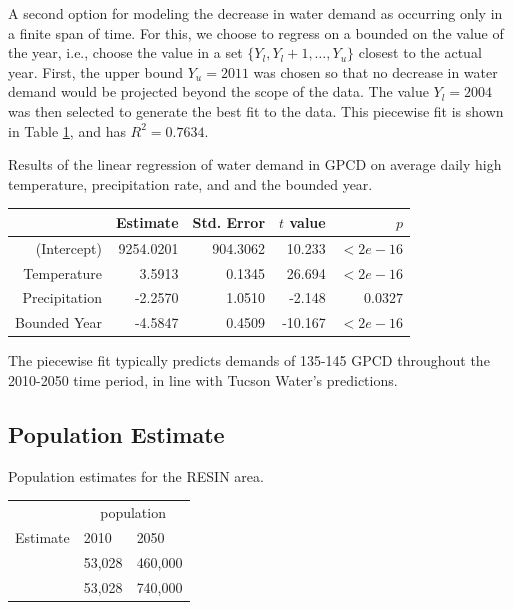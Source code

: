 \documentclass[opre,nonblindrev]{informs3} %
\begin{document}
A second option for modeling the decrease in water demand as occurring only in a finite span of time.
For this, we choose to regress on a bounded on the value of the year, i.e., choose the value in a set $\{Y_l, Y_l+1, \dots, Y_u\}$ closest to the actual year.
First, the upper bound $Y_u = 2011$ was chosen so that no decrease in water demand would be projected beyond the scope of the data.
The value $Y_l = 2004$ was then selected to generate the best fit to the data.
This piecewise fit is shown in Table \ref{tb:gpcd_piecewise_reg}, and has $R^2 = 0.7634$.

\begin{table}
	\TABLE
	{
		Results of the linear regression of water demand in GPCD on average daily high temperature, precipitation rate, and and the bounded year.
		\label{tb:gpcd_piecewise_reg}
	}
	{\begin{tabular}{rrrrr}
		\hline
						   & Estimate  & Std. Error & $t$ value & $p$ \\
		\hline
		(Intercept)    & 9254.0201 & 904.3062   & 10.233    & $<2e-16$ \\
		Temperature    & 3.5913    & 0.1345     & 26.694    & $<2e-16$ \\
		Precipitation  & -2.2570   & 1.0510     & -2.148    & $0.0327$ \\
		Bounded Year   & -4.5847   & 0.4509     & -10.167   & $<2e-16$ \\
		\hline
	\end{tabular}}
	{}
\end{table}

The piecewise fit typically predicts demands of 135-145 GPCD throughout the 2010-2050 time period, in line with Tucson Water's predictions.

\subsection{Population Estimate}

\begin{table}
	\TABLE
	{
		Population estimates for the RESIN area.
		\label{tb:population}
	}
	{\begin{tabular}{lp{}p{}}
		\hline
		         & \multicolumn{2}{c}{population} \\
		Estimate & 2010 & 2050 \\
		\hline
		\cite{taz}  & 53,028 & 460,000 \\
		\cite{wisp} & 53,028 & 740,000 \\
		\hline
	\end{tabular}}
	{}
\end{table}
\end{document}
